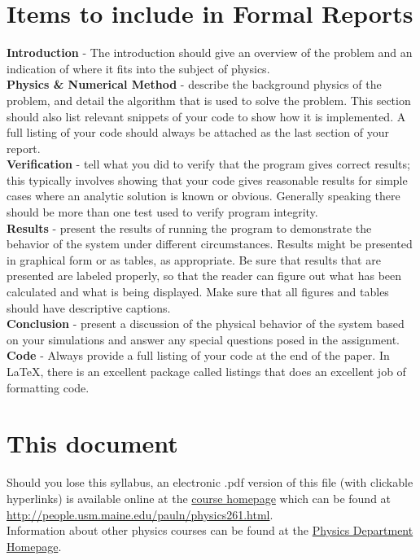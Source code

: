 \documentclass[justified]{tufte-handout}
\begin{document}
\section{Items to include in Formal Reports}
{\bf Introduction} - The introduction should give an overview of the problem and an indication of where it fits into the subject of physics.\\
{\bf Physics \& Numerical Method} - describe the background physics of the problem, and detail the algorithm that is used to solve the problem. This section should also list relevant snippets of your code to show how it is implemented.  A full listing of your code should always be attached as the last section of your report.\\
{\bf Verification} - tell what you did to verify that the program gives correct results; this typically involves showing that your code gives reasonable results for simple cases where an analytic solution is known or obvious.  Generally speaking there should be more than one test used to verify program integrity. \\
{\bf Results} - present the results of running the program to demonstrate the behavior of the system under different circumstances. Results might be presented in graphical form or as tables, as appropriate. Be sure that results that are presented are labeled properly, so that the reader can figure out what has been calculated and what is being displayed. Make sure that all figures and tables should have descriptive captions.\\
{\bf Conclusion} - present a discussion of the physical behavior of the system based on your simulations and answer any special questions posed in the assignment.\\
{\bf Code} - Always provide a full listing of your code at the end of the paper. In LaTeX, there is an excellent package called listings that does an excellent job of formatting code.\\


\section{This document}
 Should you lose this syllabus, an electronic .pdf version of this file (with clickable hyperlinks)  is available online at the \href{http://people.usm.maine.edu/pauln/physics261.html}{ course homepage}  which can be found at \\ \href{http://people.usm.maine.edu/pauln/physics261.html}{http://people.usm.maine.edu/pauln/physics261.html}.\\
 Information about other physics courses can be found at the  \href{http://usm.maine.edu/phy}{Physics Department Homepage}.
\end{document}
